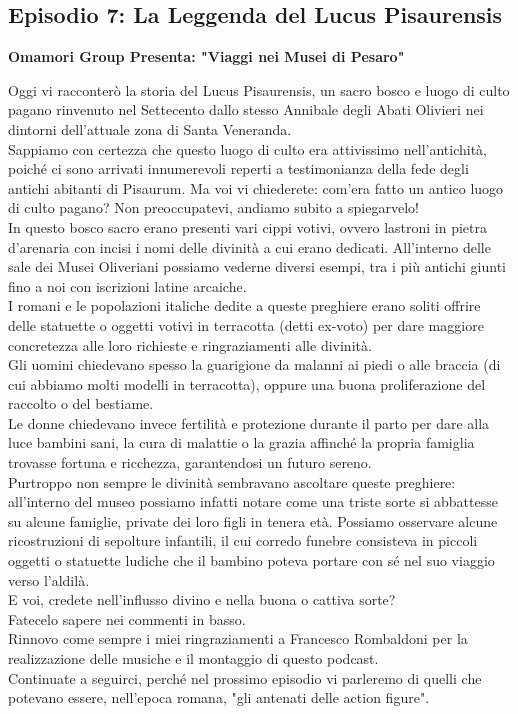 \documentclass[hidelinks,12pt,a4paper]{article}
\begin{document}
\begin{flushleft}
		\subsection{Episodio 7: La Leggenda del Lucus Pisaurensis}
		\begin{center}
			\textbf{Omamori Group Presenta: "Viaggi nei Musei di Pesaro"}
		\end{center}
		Oggi vi racconterò la storia del Lucus Pisaurensis, un sacro bosco e luogo di culto pagano rinvenuto nel Settecento dallo stesso Annibale degli Abati Olivieri nei dintorni dell'attuale zona di Santa Veneranda.\\
		Sappiamo con certezza che questo luogo di culto era attivissimo nell'antichità, poiché ci sono arrivati innumerevoli reperti a testimonianza della fede degli antichi abitanti di Pisaurum. Ma voi vi chiederete: com'era fatto un antico luogo di culto pagano? Non preoccupatevi, andiamo subito a spiegarvelo!\\
		In questo bosco sacro erano presenti vari cippi votivi, ovvero lastroni in pietra d'arenaria con incisi i nomi delle divinità a cui erano dedicati. All'interno delle sale dei Musei Oliveriani possiamo vederne diversi esempi, tra i più antichi giunti fino a noi con iscrizioni latine arcaiche.\\
		I romani e le popolazioni italiche dedite a queste preghiere erano soliti offrire delle statuette o oggetti votivi in terracotta (detti ex-voto) per dare maggiore concretezza alle loro richieste e ringraziamenti alle divinità.\\ 
		Gli uomini chiedevano spesso la guarigione da malanni ai piedi o alle braccia (di cui abbiamo molti modelli in terracotta), oppure una buona proliferazione del raccolto o del bestiame.\\
		Le donne chiedevano invece fertilità e protezione durante il parto per dare alla luce bambini sani, la cura di malattie o la grazia affinché la propria famiglia trovasse fortuna e ricchezza, garantendosi un futuro sereno.\\
		Purtroppo non sempre le divinità sembravano ascoltare queste preghiere: all'interno del museo possiamo infatti notare come una triste sorte si abbattesse su alcune famiglie, private dei loro figli in tenera età. Possiamo osservare alcune ricostruzioni di sepolture infantili, il cui corredo funebre consisteva in piccoli oggetti o statuette ludiche che il bambino poteva portare con sé nel suo viaggio verso l'aldilà.\\
		E voi, credete nell'influsso divino e nella buona o cattiva sorte?\\
		Fatecelo sapere nei commenti in basso.\\
		Rinnovo come sempre i miei ringraziamenti a Francesco Rombaldoni per la realizzazione delle musiche e il montaggio di questo podcast.\\
		Continuate a seguirci, perché nel prossimo episodio vi parleremo di quelli che potevano essere, nell'epoca romana, "gli antenati delle action figure".\\
		

\end{flushleft}
\end{document}
